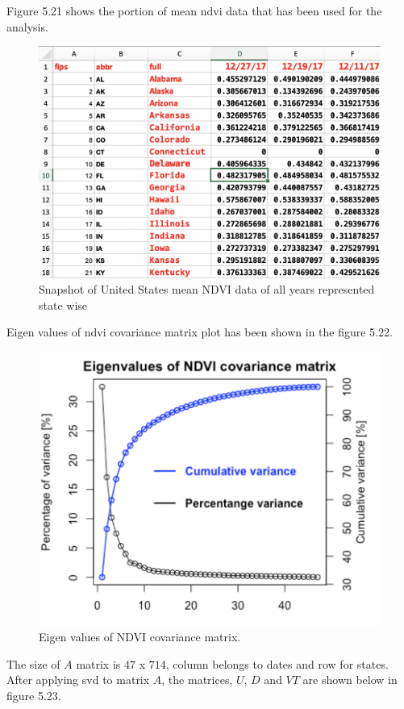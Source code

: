 Figure 5.21 shows the portion of mean \gls{ndvi} data that has been used for the analysis.

  \begin{figure}[H]
            \centering
            \includegraphics[width=1.0\linewidth]{figures/ch5/svd_data_snapshot.png}
            \caption{\label{fig:svd_data_snapshot} Snapshot of United States mean NDVI data of all years represented state wise}
    \end{figure}
    
\newpage    
Eigen values of \gls{ndvi} covariance matrix plot has been shown in the figure 5.22.

\begin{figure}[H]
            \centering
            \includegraphics[width=0.70\linewidth]{figures/ch5/SVD/covarianceeigen.png}
            \caption{\label{fig:covriance} Eigen values of NDVI covariance matrix.}
    \end{figure}


The size of $A$ matrix is $47$ x $714$, column belongs to dates and row for states. After applying \gls{svd} to matrix $A$, the matrices, $U$, $D$ and $VT$ are shown below in figure 5.23.

